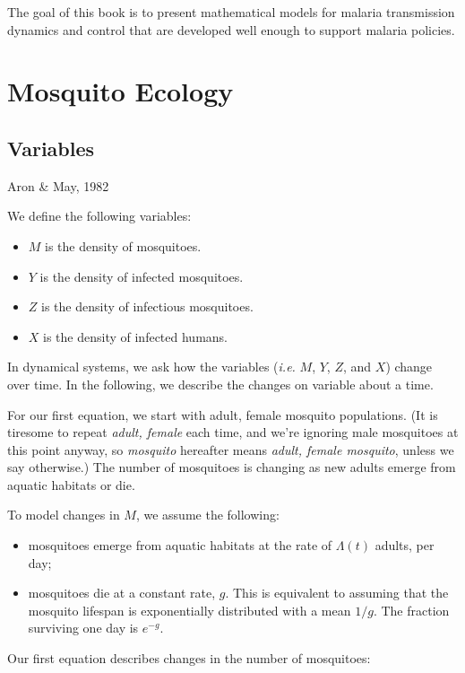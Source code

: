 \documentclass[
]{book}
\begin{document}
The goal of this book is to present mathematical models for malaria transmission dynamics and control that are developed well enough to support malaria policies.

\section{Mosquito Ecology}\label{mosquito-ecology}

\subsection{Variables}\label{variables-2}

Aron \& May, 1982

We define the following variables:

\begin{itemize}
\item
  \(M\) is the density of mosquitoes.
\item
  \(Y\) is the density of infected mosquitoes.
\item
  \(Z\) is the density of infectious mosquitoes.
\item
  \(X\) is the density of infected humans.
\end{itemize}

In dynamical systems, we ask how the variables (\emph{i.e.} \(M\), \(Y\), \(Z\), and \(X\)) change over time. In the following, we describe the changes on variable about a time.

For our first equation, we start with adult, female mosquito populations. (It is tiresome to repeat \emph{adult, female} each time, and we're ignoring male mosquitoes at this point anyway, so \emph{mosquito} hereafter means \emph{adult, female mosquito}, unless we say otherwise.) The number of mosquitoes is changing as new adults emerge from aquatic habitats or die.

To model changes in \(M\), we assume the following:

\begin{itemize}
\item
  mosquitoes emerge from aquatic habitats at the rate of \(\Lambda(t)\) adults, per day;
\item
  mosquitoes die at a constant rate, \(g\). This is equivalent to assuming that the mosquito lifespan is exponentially distributed with a mean \(1/g\). The fraction surviving one day is \(e^{-g}\).
\end{itemize}

Our first equation describes changes in the number of mosquitoes:
\end{document}
